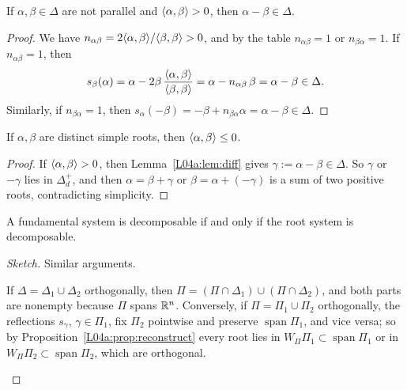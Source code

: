 \begin{lemma}\label{L04a:lem:diff}
If $\alpha,\beta\in\Delta$ are not parallel and $\langle \alpha, \beta\rangle>0$, then $\alpha-\beta\in\Delta$.
\end{lemma}

\begin{proof}
We have $n_{\alpha\beta}=2\langle \alpha, \beta\rangle/\langle \beta, \beta\rangle>0$, and by the table
$n_{\alpha\beta}=1$ or $n_{\beta\alpha}=1$. If $n_{\alpha\beta}=1$, then
\[
  s_\beta(\alpha) = \alpha - 2\beta\,\frac{\langle \alpha, \beta\rangle}{\langle \beta, \beta\rangle}
  = \alpha-n_{\alpha\beta}\,\beta = \alpha-\beta\in\Delta.
\]
Similarly, if $n_{\beta\alpha}=1$, then $s_\alpha(-\beta)=-\beta+n_{\beta\alpha}\alpha=\alpha-\beta\in\Delta$.
\end{proof}

\begin{lemma}\label{L04a:lem:obtuse}
If $\alpha,\beta$ are distinct simple roots, then $\langle \alpha, \beta\rangle\le0$.
\end{lemma}

\begin{proof}
If $\langle \alpha, \beta\rangle>0$, then 
Lemma~\ref{L04a:lem:diff} gives $\gamma:=\alpha-\beta\in\Delta$. So $\gamma$ or $-\gamma$ lies in
$\Delta_d^+$, and then $\alpha=\beta+\gamma$ or $\beta=\alpha+(-\gamma)$ is a sum of two positive roots,
contradicting simplicity.
\end{proof}

\begin{proposition}\label{L04a:prop:decomp}
A fundamental system is decomposable  if and only
if the root system is decomposable.
\end{proposition}

\begin{proof}[Sketch]
Similar arguments.
\begin{addedblock}
If $\Delta=\Delta_1\cup\Delta_2$ orthogonally, then $\Pi=(\Pi\cap\Delta_1)\cup(\Pi\cap\Delta_2)$, and
both parts are nonempty because $\Pi$ spans $\mathbb{R}^n$. Conversely, if $\Pi=\Pi_1\cup\Pi_2$ orthogonally,
the reflections $s_\gamma$, $\gamma\in\Pi_1$, fix $\Pi_2$ pointwise and preserve
$\operatorname{span}\Pi_1$, and vice versa; so by
Proposition~\ref{L04a:prop:reconstruct} every root lies in $W_\Pi\Pi_1\subset\operatorname{span}\Pi_1$ or
in $W_\Pi\Pi_2\subset\operatorname{span}\Pi_2$, which are orthogonal.
\end{addedblock}
\end{proof}

